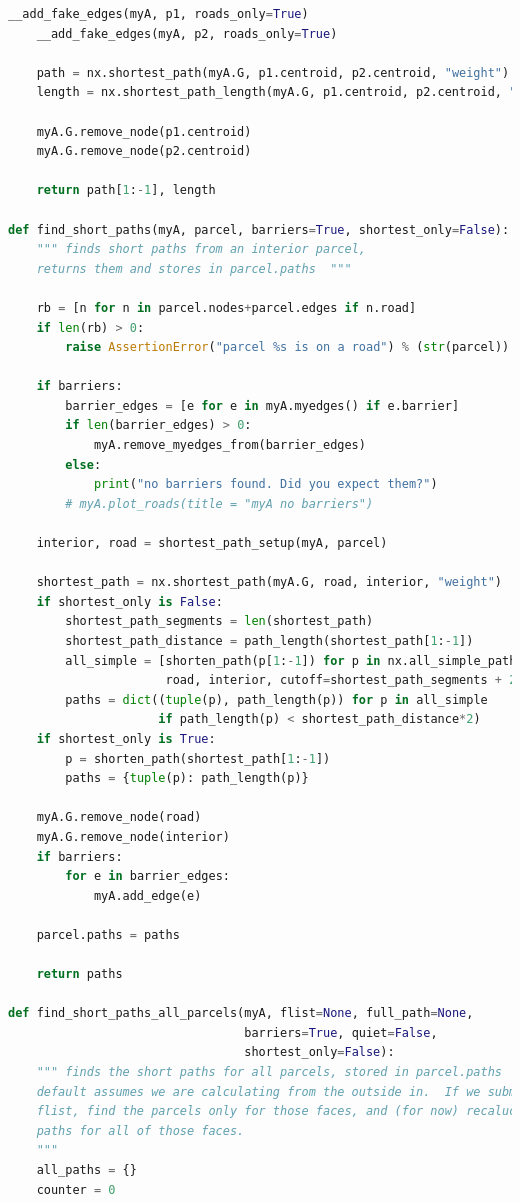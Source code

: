 \documentclass[10pt]{article}
\begin{document}
\begin{lstlisting}[language=Python]
    __add_fake_edges(myA, p1, roads_only=True)
    __add_fake_edges(myA, p2, roads_only=True)

    path = nx.shortest_path(myA.G, p1.centroid, p2.centroid, "weight")
    length = nx.shortest_path_length(myA.G, p1.centroid, p2.centroid, "weight")

    myA.G.remove_node(p1.centroid)
    myA.G.remove_node(p2.centroid)

    return path[1:-1], length

def find_short_paths(myA, parcel, barriers=True, shortest_only=False):
    """ finds short paths from an interior parcel,
    returns them and stores in parcel.paths  """

    rb = [n for n in parcel.nodes+parcel.edges if n.road]
    if len(rb) > 0:
        raise AssertionError("parcel %s is on a road") % (str(parcel))

    if barriers:
        barrier_edges = [e for e in myA.myedges() if e.barrier]
        if len(barrier_edges) > 0:
            myA.remove_myedges_from(barrier_edges)
        else:
            print("no barriers found. Did you expect them?")
        # myA.plot_roads(title = "myA no barriers")

    interior, road = shortest_path_setup(myA, parcel)

    shortest_path = nx.shortest_path(myA.G, road, interior, "weight")
    if shortest_only is False:
        shortest_path_segments = len(shortest_path)
        shortest_path_distance = path_length(shortest_path[1:-1])
        all_simple = [shorten_path(p[1:-1]) for p in nx.all_simple_paths(myA.G,
                      road, interior, cutoff=shortest_path_segments + 2)]
        paths = dict((tuple(p), path_length(p)) for p in all_simple
                     if path_length(p) < shortest_path_distance*2)
    if shortest_only is True:
        p = shorten_path(shortest_path[1:-1])
        paths = {tuple(p): path_length(p)}

    myA.G.remove_node(road)
    myA.G.remove_node(interior)
    if barriers:
        for e in barrier_edges:
            myA.add_edge(e)

    parcel.paths = paths

    return paths

def find_short_paths_all_parcels(myA, flist=None, full_path=None,
                                 barriers=True, quiet=False,
                                 shortest_only=False):
    """ finds the short paths for all parcels, stored in parcel.paths
    default assumes we are calculating from the outside in.  If we submit an
    flist, find the parcels only for those faces, and (for now) recaluclate
    paths for all of those faces.
    """
    all_paths = {}
    counter = 0


\end{lstlisting}
\end{document}
